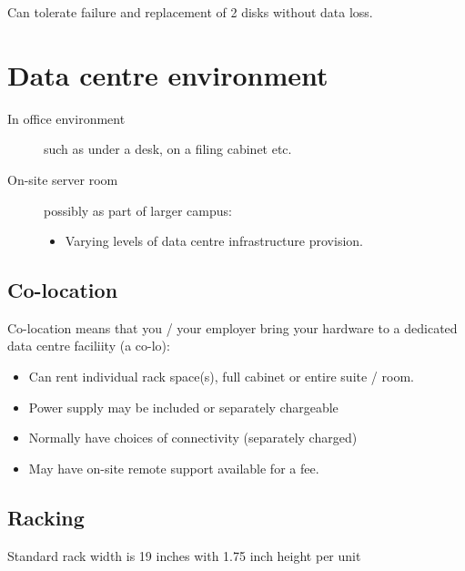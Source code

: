 \documentclass[slides]{pgnotes}
\begin{document}
Can tolerate failure and replacement of 2 disks without data loss.

\section{Data centre environment}

\begin{description}

\item[In office environment] such as under a desk, on a filing cabinet etc.
  
\item[On-site server room] possibly as part of larger campus:
  \begin{itemize}
  \item Varying levels of data centre infrastructure provision.
  \end{itemize}
\end{description}

\subsection{Co-location}

Co-location means that you / your employer bring your hardware to a dedicated data centre faciliity (a co-lo):

\begin{itemize}
\item Can rent individual rack space(s), full cabinet or entire suite / room.
\item Power supply may be included or separately chargeable
\item Normally have choices of connectivity (separately charged)
\item May have on-site remote support available for a fee.
\end{itemize}


\subsection{Racking}

Standard rack width is 19 inches with 1.75 inch height per unit
\end{document}
